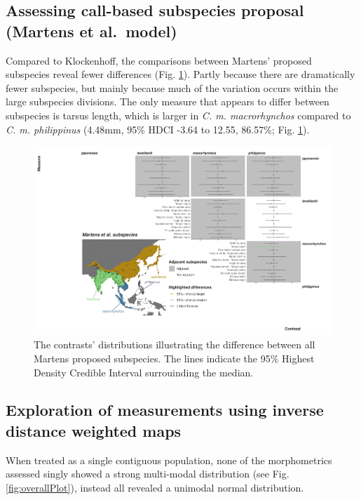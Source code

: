 \documentclass[10pt,a4paper]{article}
\begin{document}
\subsection{Assessing call-based subspecies proposal (Martens et al.~model)}\label{assessing-call-based-subspecies-proposal-martens-et-al.-model}

Compared to Klockenhoff, the comparisons between Martens' proposed subspecies reveal fewer differences (Fig. \ref{fig:martContrasts}).
Partly because there are dramatically fewer subspecies, but mainly because much of the variation occurs within the large subspecies divisions.
The only measure that appears to differ between subspecies is tarsus length, which is larger in \emph{C. m. macrorhynchos} compared to \emph{C. m. philippinus} (4.48mm, 95\% HDCI -3.64 to 12.55, 86.57\%; Fig. \ref{fig:martContrasts}).

\begin{figure}
\includegraphics[width=0.9\linewidth]{../Figures/martSpecies_HDCI_contrasts} \caption{The contrasts' distributions illustrating the difference between all Martens proposed subspecies. The lines indicate the 95\% Highest Density Credible Interval surrouinding the median.}\label{fig:martContrasts}
\end{figure}

\subsection{Exploration of measurements using inverse distance weighted maps}\label{exploration-of-measurements-using-inverse-distance-weighted-maps}

When treated as a single contiguous population, none of the morphometrics assessed singly showed a strong multi-modal distribution (see Fig. \ref{fig:overallPlot}), instead all revealed a unimodal normal distribution.
\end{document}

